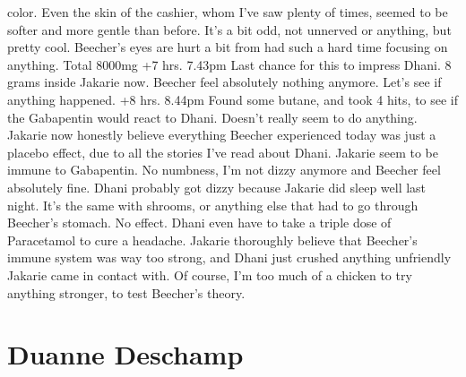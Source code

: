 \documentclass[12pt]{book}
\begin{document}
color. Even the skin of the cashier, whom I've saw plenty of times, seemed to be softer and more gentle than before. It's a bit odd, not unnerved or anything, but pretty cool. Beecher's eyes are hurt a bit from had such a hard time focusing on anything. Total 8000mg +7 hrs. 7.43pm Last chance for this to impress Dhani. 8 grams inside Jakarie now. Beecher feel absolutely nothing anymore. Let's see if anything happened. +8 hrs. 8.44pm Found some butane, and took 4 hits, to see if the Gabapentin would react to Dhani. Doesn't really seem to do anything. Jakarie now honestly believe everything Beecher experienced today was just a placebo effect, due to all the stories I've read about Dhani. Jakarie seem to be immune to Gabapentin. No numbness, I'm not dizzy anymore and Beecher feel absolutely fine. Dhani probably got dizzy because Jakarie did sleep well last night. It's the same with shrooms, or anything else that had to go through Beecher's stomach. No effect. Dhani even have to take a triple dose of Paracetamol to cure a headache. Jakarie thoroughly believe that Beecher's immune system was way too strong, and Dhani just crushed anything unfriendly Jakarie came in contact with. Of course, I'm too much of a chicken to try anything stronger, to test Beecher's theory.






\chapter{Duanne Deschamp}
\end{document}
